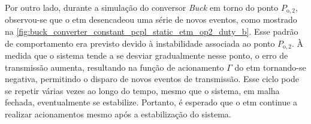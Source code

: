 Por outro lado, durante a simulação do conversor \textit{Buck} em torno do ponto $P_{\mathrm{o}, 2}$, observou-se que o \acrshort{etm} desencadeou uma série de novos eventos, como mostrado na \autoref{fig:buck_converter_constant_pcpl_static_etm_op2_duty_b}. Esse padrão de comportamento era previsto devido à instabilidade associada ao ponto $P_{\mathrm{o}, 2}$. À medida que o sistema tende a se desviar gradualmente nesse ponto, o erro de transmissão aumenta, resultando na função de acionamento $\Gamma$ do \acrshort{etm} tornando-se negativa, permitindo o disparo de novos eventos de transmissão. Esse ciclo pode se repetir várias vezes ao longo do tempo, mesmo que o sistema, em malha fechada, eventualmente se estabilize. Portanto, é esperado que o \acrshort{etm} continue a realizar acionamentos mesmo após a estabilização do sistema.

